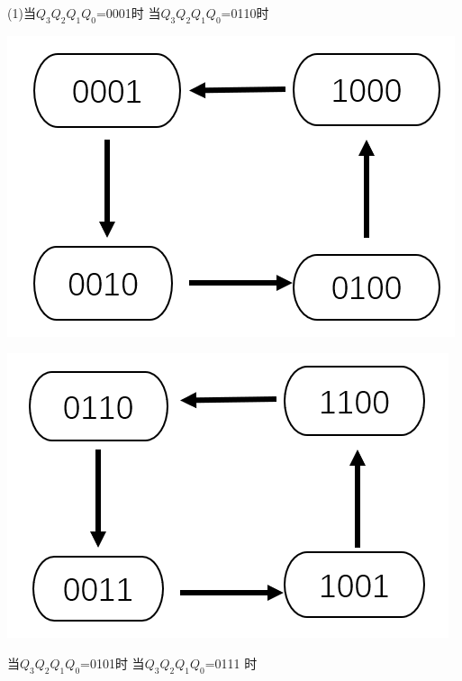 \documentclass{ctexart}
\begin{document}
\noindent (1)\qquad \qquad \qquad \quad 当$Q_3Q_2Q_1Q_0$=0001时     \qquad \qquad \qquad \qquad\qquad 当$Q_3Q_2Q_1Q_0$=0110时
    
    \begin{minipage}[c]{0.5\textwidth}
        \centering
        \includegraphics[width=0.75\linewidth]{3.1.1.png} 
    \end{minipage}
    \begin{minipage}[c]{0.45\textwidth}
        \centering
        \includegraphics[width=0.8\linewidth]{3.1.2.png} 
    \end{minipage}

   \qquad \qquad \qquad  当$Q_3Q_2Q_1Q_0$=0101时     \qquad \qquad \qquad \qquad\qquad 当$Q_3Q_2Q_1Q_0$=0111 时
\end{document}
